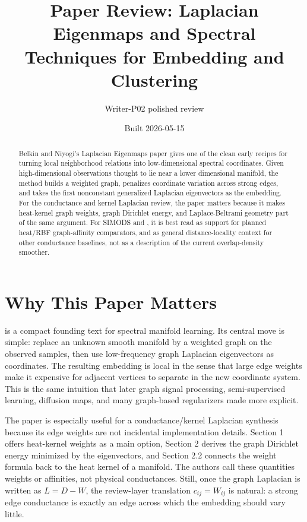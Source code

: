 \documentclass[11pt]{article}
\title{Paper Review: Laplacian Eigenmaps and Spectral Techniques for Embedding and Clustering}
\author{Writer-P02 polished review}
\date{Built 2026-05-15}
\begin{document}
\maketitle

\begin{abstract}
Belkin and Niyogi's Laplacian Eigenmaps paper gives one of the clean early
recipes for turning local neighborhood relations into low-dimensional spectral
coordinates. Given high-dimensional observations thought to lie near a lower
dimensional manifold, the method builds a weighted graph, penalizes coordinate
variation across strong edges, and takes the first nonconstant generalized
Laplacian eigenvectors as the embedding. For the conductance and kernel
Laplacian review, the paper matters because it makes heat-kernel graph weights,
graph Dirichlet energy, and Laplace-Beltrami geometry part of the same argument.
For SIMODS and , it is best read as support for planned heat/RBF
graph-affinity comparators, and as general distance-locality context for other
conductance baselines, not as a description of the current overlap-density
smoother.
\end{abstract}

\section{Why This Paper Matters}

\citet{belkin2001laplacian} is a compact founding text for spectral manifold
learning. Its central move is simple: replace an unknown smooth manifold by a
weighted graph on the observed samples, then use low-frequency graph Laplacian
eigenvectors as coordinates. The resulting embedding is local in the sense that
large edge weights make it expensive for adjacent vertices to separate in the
new coordinate system. This is the same intuition that later graph signal
processing, semi-supervised learning, diffusion maps, and many graph-based
regularizers made more explicit.

The paper is especially useful for a conductance/kernel Laplacian synthesis
because its edge weights are not incidental implementation details. Section 1
offers heat-kernel weights as a main option, Section 2 derives the graph
Dirichlet energy minimized by the eigenvectors, and Section 2.2 connects the
weight formula back to the heat kernel of a manifold. The authors call these
quantities weights or affinities, not physical conductances. Still, once the
graph Laplacian is written as \(L=D-W\), the review-layer translation
\(c_{ij}=W_{ij}\) is natural: a strong edge conductance is exactly an edge
across which the embedding should vary little.
\end{document}
